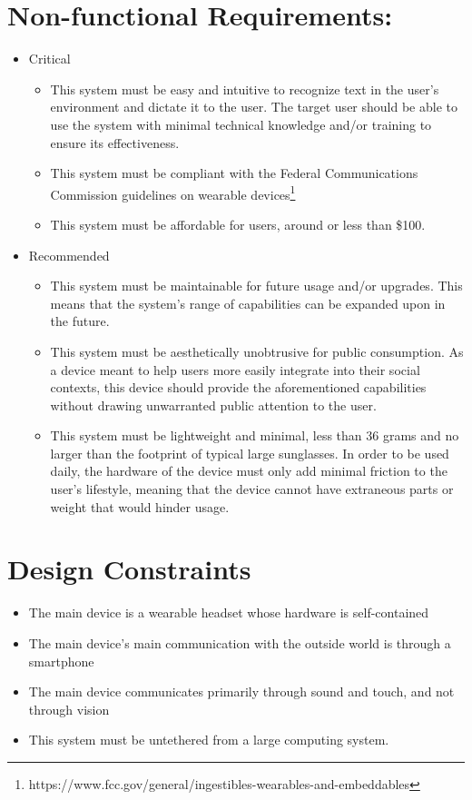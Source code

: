 \pagebreak

\section{Non-functional Requirements:}
\begin{itemize}
\item Critical
	\begin{itemize}
	\item This system must be easy and intuitive to recognize text in the user's environment and dictate it to the user. The target user should be able to use the system with minimal technical knowledge and/or training to ensure its effectiveness.
	\item This system must be compliant with the Federal Communications Commission guidelines on wearable devices\footnote{https://www.fcc.gov/general/ingestibles-wearables-and-embeddables}
	\item This system must be affordable for users, around or less than \$100.
    \end{itemize}
\item Recommended
	\begin{itemize}
	\item This system must be maintainable for future usage and/or upgrades. This means that the system's range of capabilities can be expanded upon in the future.
	\item This system must be aesthetically unobtrusive for public consumption. As a device meant to help users more easily integrate into their social contexts, this device should provide the aforementioned capabilities without drawing unwarranted public attention to the user.
	\item This system must be lightweight and minimal, less than 36 grams and no larger than the footprint of typical large sunglasses. In order to be used daily, the hardware of the device must only add minimal friction to the user's lifestyle, meaning that the device cannot have extraneous parts or weight that would hinder usage.
	\end{itemize}
\end{itemize}

\section{Design Constraints}
\begin{itemize}
\item The main device is a wearable headset whose hardware is self-contained
\item The main device's main communication with the outside world is through a smartphone
\item The main device communicates primarily through sound and touch, and not through vision
\item This system must be untethered from a large computing system.
\end{itemize}
